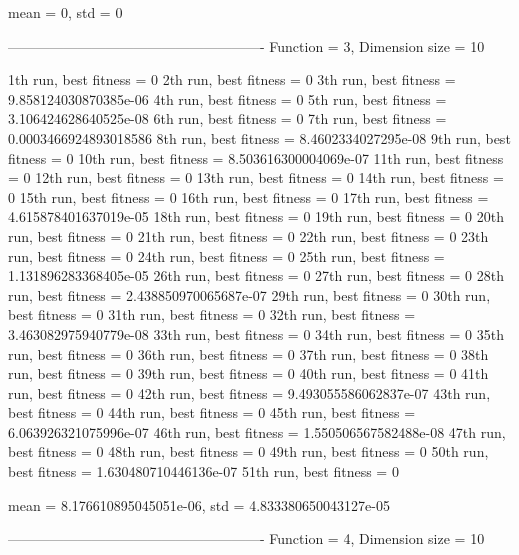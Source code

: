 mean = 0, std = 0

-------------------------------------------------------
Function = 3, Dimension size = 10

1th run, best fitness = 0
2th run, best fitness = 0
3th run, best fitness = 9.858124030870385e-06
4th run, best fitness = 0
5th run, best fitness = 3.106424628640525e-08
6th run, best fitness = 0
7th run, best fitness = 0.0003466924893018586
8th run, best fitness = 8.4602334027295e-08
9th run, best fitness = 0
10th run, best fitness = 8.503616300004069e-07
11th run, best fitness = 0
12th run, best fitness = 0
13th run, best fitness = 0
14th run, best fitness = 0
15th run, best fitness = 0
16th run, best fitness = 0
17th run, best fitness = 4.615878401637019e-05
18th run, best fitness = 0
19th run, best fitness = 0
20th run, best fitness = 0
21th run, best fitness = 0
22th run, best fitness = 0
23th run, best fitness = 0
24th run, best fitness = 0
25th run, best fitness = 1.131896283368405e-05
26th run, best fitness = 0
27th run, best fitness = 0
28th run, best fitness = 2.438850970065687e-07
29th run, best fitness = 0
30th run, best fitness = 0
31th run, best fitness = 0
32th run, best fitness = 3.463082975940779e-08
33th run, best fitness = 0
34th run, best fitness = 0
35th run, best fitness = 0
36th run, best fitness = 0
37th run, best fitness = 0
38th run, best fitness = 0
39th run, best fitness = 0
40th run, best fitness = 0
41th run, best fitness = 0
42th run, best fitness = 9.493055586062837e-07
43th run, best fitness = 0
44th run, best fitness = 0
45th run, best fitness = 6.063926321075996e-07
46th run, best fitness = 1.550506567582488e-08
47th run, best fitness = 0
48th run, best fitness = 0
49th run, best fitness = 0
50th run, best fitness = 1.630480710446136e-07
51th run, best fitness = 0

mean = 8.176610895045051e-06, std = 4.833380650043127e-05

-------------------------------------------------------
Function = 4, Dimension size = 10

